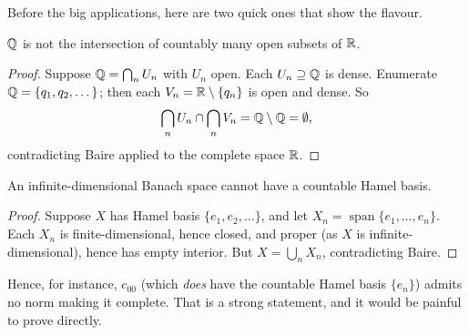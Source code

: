 \documentclass[a4paper]{scrartcl}
\newcommand{\spn}{\operatorname{span}}
\begin{document}
\begin{center}
\end{center}

Before the big applications, here are two quick ones that show the flavour.

\begin{proposition}
	$\mathbb{Q}$ is not the intersection of countably many open subsets of $\mathbb{R}$.
\end{proposition}

\begin{proof}
	Suppose $\mathbb{Q} = \bigcap_n U_n$ with $U_n$ open. Each $U_n \supseteq \mathbb{Q}$ is dense. Enumerate $\mathbb{Q} = \{q_1, q_2, \dots\}$; then each $V_n = \mathbb{R} \setminus \{q_n\}$ is open and dense. So
	$$\bigcap_n U_n \cap \bigcap_n V_n = \mathbb{Q} \setminus \mathbb{Q} = \emptyset,$$
	contradicting Baire applied to the complete space $\mathbb{R}$.
\end{proof}

\begin{proposition}
	An infinite-dimensional Banach space cannot have a countable Hamel basis.
\end{proposition}

\begin{proof}
	Suppose $X$ has Hamel basis $\{e_1, e_2, \dots\}$, and let $X_n = \spn\{e_1,\dots,e_n\}$. Each $X_n$ is finite-dimensional, hence closed, and proper (as $X$ is infinite-dimensional), hence has empty interior. But $X = \bigcup_n X_n$, contradicting Baire.
\end{proof}

\begin{remark}
	Hence, for instance, $c_{00}$ (which \emph{does} have the countable Hamel basis $\{e_n\}$) admits no norm making it complete. That is a strong statement, and it would be painful to prove directly.
\end{remark}
\end{document}
